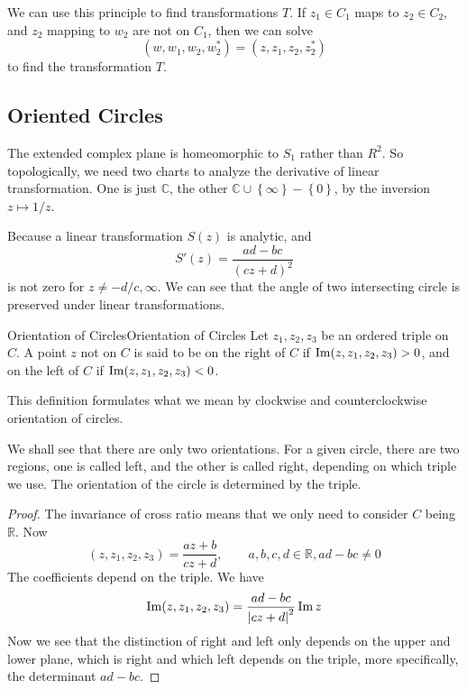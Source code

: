 \documentclass[../main.tex]{subfiles}
\begin{document}
We can use this principle to find transformations $T$. If $z_1\in C_1$ maps to $z_2\in C_2$, and $z_2$ mapping to $w_2$ are not on $C_1$, then we can solve
\begin{equation*}
	(w,w_1,w_2,w_2^*) = (z,z_1,z_2,z_2^*)
\end{equation*}
to find the transformation $T$.

\subsection{Oriented Circles}
The extended complex plane is homeomorphic to $S_1$ rather than $R^2$. So topologically, we need two charts to analyze the derivative of linear transformation. One is just $\mathbb{C}$, the other $\mathbb{C}\cup \left\{ \infty  \right\} - \left\{ 0 \right\}$, by the inversion $z \mapsto 1/z$.

Because a linear transformation $S(z)$ is analytic, and
\begin{equation}
	 S'(z) = \frac{ad-bc}{(cz+d)^2}
\end{equation}
is not zero for $z\neq -d / c, \infty $. We can see that the angle of two intersecting circle is preserved under linear transformations.

\begin{definition}{Orientation of Circles}{Orientation of Circles}
Let $z_1,z_2,z_3$ be an ordered triple on $C$. A point $z$ not on $C$ is said to be on the right of $C$ if $\operatorname{Im} (z,z_1,z_2,z_3) > 0$, and on the left of $C$ if $\operatorname{Im} (z,z_1,z_2,z_3) < 0$.

This definition formulates what we mean by clockwise and counterclockwise orientation of circles.
\end{definition}

We shall see that there are only two orientations. For a given circle, there are two regions, one is called left, and the other is called right, depending on which triple we use. The orientation of the circle is determined by the triple.
\begin{proof}
The invariance of cross ratio means that we only need to consider $C$ being $\mathbb{R}$. Now
\begin{equation*}
	(z,z_1,z_2,z_3) = \frac{az+b}{cz+d}, \qquad a,b,c,d\in \mathbb{R}, ad-bc\neq 0
\end{equation*}
The coefficients depend on the triple. We have
\begin{equation*}
	\operatorname{Im} (z,z_1,z_2,z_3) = \frac{ad-bc}{\left|cz+d\right|^2}\operatorname{Im} z
\end{equation*}
Now we see that the distinction of right and left only depends on the upper and lower plane, which is right and which left depends on the triple, more specifically, the determinant $ad-bc$.
\end{proof}
\end{document}
